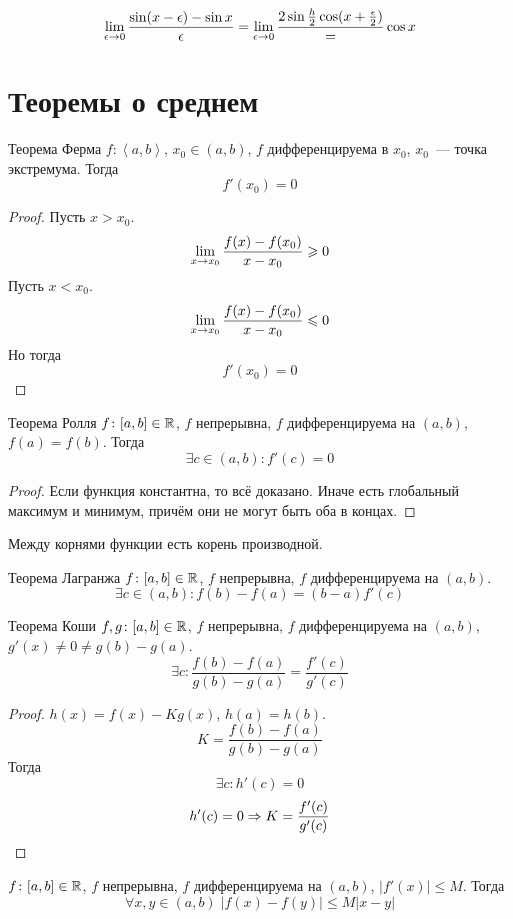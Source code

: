 $$\lim_{\epsilon\rightarrow 0} \frac{\sin(x - \epsilon) - \sin x}{\epsilon} = \lim_{\epsilon\rightarrow 0} \frac {2\sin\frac{h}2 \cos (x + \frac{\epsilon}2)} = \cos x$$

\section{Теоремы о среднем}
\begin{theorem}{Теорема Ферма}
$f\colon \left<a, b\right>$, $x_0 \in (a, b)$, $f$ дифференцируема в $x_0$, $x_0$~--- точка экстремума. Тогда
$$f'(x_0) = 0$$
\end{theorem}
\begin{proof}
Пусть $x > x_0$.
$$\lim_{x\rightarrow x_0} \frac{f(x) - f(x_0)}{x - x_0} \geqslant 0$$
Пусть $x < x_0$.
$$\lim_{x\rightarrow x_0} \frac{f(x) - f(x_0)}{x - x_0} \leqslant 0$$
Но тогда
$$f'(x_0) = 0$$
\end{proof}

\begin{theorem}{Теорема Ролля}
$f\colon [a, b] \in \mathbb{R}$, $f$ непрерывна, $f$ дифференцируема на $(a, b)$, $f(a) = f(b)$.
Тогда
$$\exists c\in(a, b)\colon f'(c) = 0$$
\end{theorem}
\begin{proof}
Если функция константна, то всё доказано. Иначе есть глобальный максимум и минимум, причём они не могут быть оба в концах.
\end{proof}

\begin{conseq}
Между корнями функции есть корень производной.
\end{conseq}

\begin{theorem}{Теорема Лагранжа}
$f\colon [a, b] \in \mathbb{R}$, $f$ непрерывна, $f$ дифференцируема на $(a, b)$.
$$\exists c \in (a, b)\colon f(b) - f(a) = (b-a) f'(c)$$
\end{theorem}
\begin{theorem}{Теорема Коши}
$f, g\colon [a, b] \in \mathbb{R}$, $f$ непрерывна, $f$ дифференцируема на $(a, b)$, $g'(x) \ne 0 \ne g(b) - g(a)$.
$$\exists c\colon \frac{f(b) - f(a)}{g(b) - g(a)} = \frac{f'(c)}{g'(c)}$$
\end{theorem}
\begin{proof}
$h(x) = f(x) - Kg(x)$, $h(a) = h(b)$.
$$K = \frac{f(b) - f(a)}{g(b) - g(a)}$$
Тогда
$$\exists c\colon h'(c) = 0$$
$$h'(c) = 0 \Rightarrow K = \frac{f'(c)}{g'(c)}$$
\end{proof}

\begin{conseq}
$f\colon [a, b] \in \mathbb{R}$, $f$ непрерывна, $f$ дифференцируема на $(a, b)$, $|f'(x)| \leqslant M$.
Тогда
$$\forall x,y\in(a,b)\; |f(x) - f(y)| \leqslant M|x-y|$$
\end{conseq}